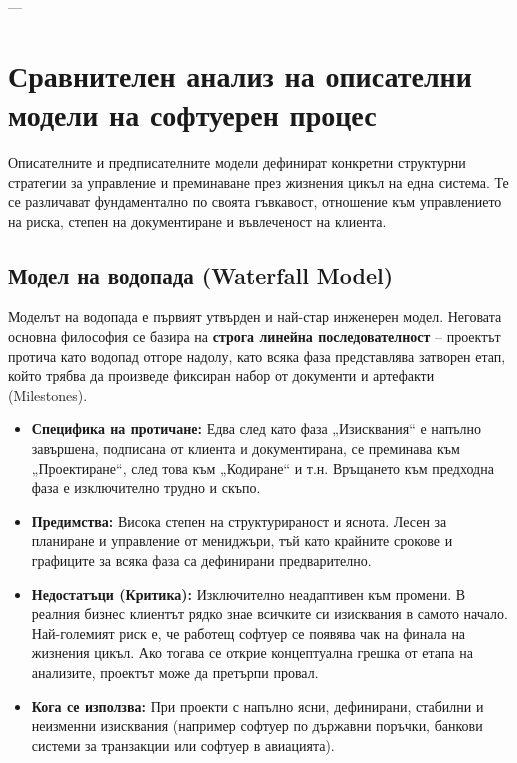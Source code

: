 \documentclass{scrartcl}
\begin{document}
\begin{FlushLeft}
---

\section{Сравнителен анализ на описателни модели на софтуерен процес}

Описателните и предписателните модели дефинират конкретни структурни стратегии за управление и преминаване през жизнения цикъл на една система. Те се различават фундаментално по своята гъвкавост, отношение към управлението на риска, степен на документиране и въвлеченост на клиента.

\subsection{Модел на водопада (Waterfall Model)}
Моделът на водопада е първият утвърден и най-стар инженерен модел. Неговата основна философия се базира на \textbf{строга линейна последователност} – проектът протича като водопад отгоре надолу, като всяка фаза представлява затворен етап, който трябва да произведе фиксиран набор от документи и артефакти (Milestones).
\begin{itemize}
    \item \textbf{Специфика на протичане:} Едва след като фаза „Изисквания“ е напълно завършена, подписана от клиента и документирана, се преминава към „Проектиране“, след това към „Кодиране“ и т.н. Връщането към предходна фаза е изключително трудно и скъпо.
    \item \textbf{Предимства:} Висока степен на структурираност и яснота. Лесен за планиране и управление от мениджъри, тъй като крайните срокове и графиците за всяка фаза са дефинирани предварително.
    \item \textbf{Недостатъци (Критика):} Изключително неадаптивен към промени. В реалния бизнес клиентът рядко знае всичките си изисквания в самото начало. Най-големият риск е, че работещ софтуер се появява чак на финала на жизнения цикъл. Ако тогава се открие концептуална грешка от етапа на анализите, проектът може да претърпи провал.
    \item \textbf{Кога се използва:} При проекти с напълно ясни, дефинирани, стабилни и неизменни изисквания (например софтуер по държавни поръчки, банкови системи за транзакции или софтуер в авиацията).
\end{itemize}


\end{FlushLeft}
\end{document}
